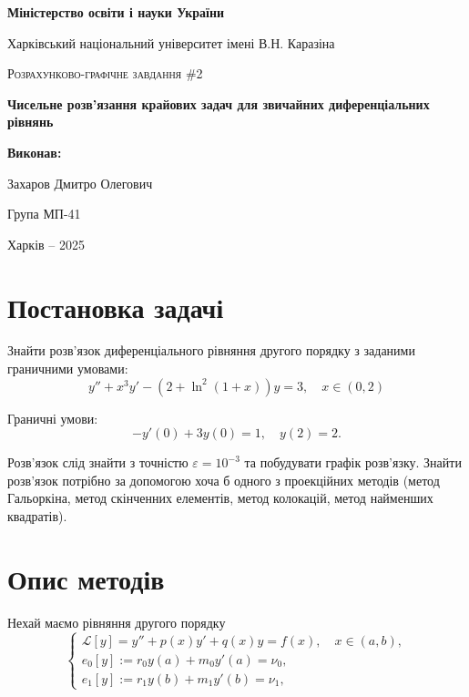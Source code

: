 \documentclass[14pt]{extarticle}
\begin{document}
\begin{titlepage}
	\centering
	{\textbf{Міністерство освіти і науки України}\par
 Харківський національний університет імені В.Н. Каразіна\par}
    \vspace{1cm}
	{\Large \textsc{Розрахунково-графічне завдання \#2}\par
    \textbf{Чисельне розв'язання крайових задач для звичайних диференціальних рівнянь}\par}
	\vfill
 \begin{FlushRight}
	\textbf{Виконав:}\par Захаров Дмитро Олегович \par Група МП-41
\end{FlushRight}
	\vfill

	{\large Харків -- 2025\par}
\end{titlepage}

\tableofcontents
\pagebreak

\section{Постановка задачі}

Знайти розв'язок диференціального рівняння другого порядку 
з заданими граничними умовами:
\begin{equation*}
    y'' + x^3y' - (2+\ln^2(1+x))y = 3, \quad x \in (0,2)
\end{equation*}

Граничні умови:
\begin{equation*}
    -y'(0) + 3y(0) = 1, \quad y(2) = 2.
\end{equation*}

Розв'язок слід знайти з точністю $\varepsilon = 10^{-3}$ та 
побудувати графік розв'язку. Знайти розв'язок потрібно 
за допомогою хоча б одного з проекційних методів (метод Гальоркіна,
метод скінченних елементів, метод колокацій, метод найменших квадратів).

\pagebreak
\section{Опис методів}

Нехай маємо рівняння другого порядку
\begin{equation*}
    \begin{cases}
        \mathcal{L}[y] = y'' + p(x)y' + q(x)y = f(x), \quad x \in (a,b), \\
        e_0[y] := r_0y(a) + m_0y'(a) = \nu_0, \\
        e_1[y] := r_1y(b) + m_1y'(b) = \nu_1,
    \end{cases}
\end{equation*}
\end{document}

